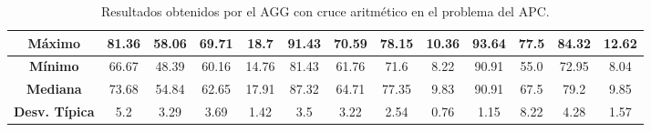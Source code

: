 \documentclass[11pt,a4paper]{article}
\begin{document}
\begin{table}[H]
{\begin{tabular}{c|c|c|c|c|c|c|c|c|c|c|c|c|}
\multicolumn{1}{|c|}{\textbf{Máximo}}       & 81.36             & 58.06                   & 69.71         & 18.7       & 91.43             & 70.59          & 78.15         & 10.36      & 93.64             & 77.5           & 84.32         & 12.62      \\ \hline
\multicolumn{1}{|c|}{\textbf{Mínimo}}       & 66.67             & 48.39                   & 60.16         & 14.76      & 81.43             & 61.76          & 71.6          & 8.22       & 90.91             & 55.0           & 72.95         & 8.04       \\ \hline
\multicolumn{1}{|c|}{\textbf{Mediana}}      & 73.68             & 54.84                   & 62.65         & 17.91      & 87.32             & 64.71          & 77.35         & 9.83       & 90.91             & 67.5           & 79.2          & 9.85       \\ \hline
\multicolumn{1}{|c|}{\textbf{Desv. Típica}} & 5.2               & 3.29                    & 3.69          & 1.42       & 3.5               & 3.22           & 2.54          & 0.76       & 1.15              & 8.22           & 4.28          & 1.57       \\ \hline
\end{tabular}
}%
\caption{Resultados obtenidos por el AGG con cruce aritmético en el problema del APC.}
\end{table}
\end{document}
